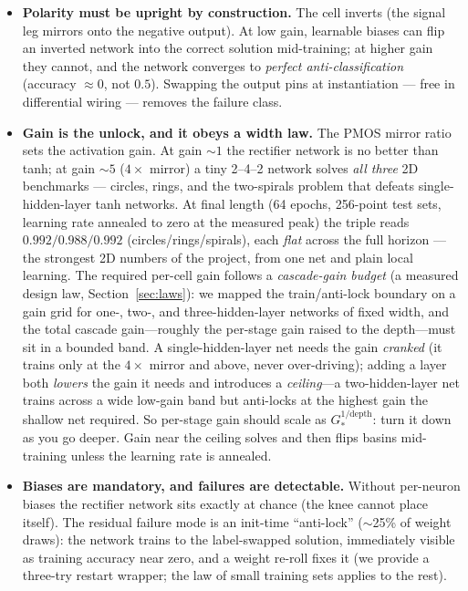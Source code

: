 \documentclass[11pt]{article}
\begin{document}
\begin{itemize}
\item \textbf{Polarity must be upright by construction.} The cell inverts (the signal leg mirrors onto the negative output). At low gain, learnable biases can flip an inverted network into the correct solution mid-training; at higher gain they cannot, and the network converges to \emph{perfect anti-classification} (accuracy $\approx 0$, not $0.5$). Swapping the output pins at instantiation --- free in differential wiring --- removes the failure class.
\item \textbf{Gain is the unlock, and it obeys a width law.} The PMOS mirror ratio sets the activation gain. At gain ${\sim}1$ the rectifier network is no better than tanh; at gain ${\sim}5$ ($4\times$ mirror) a tiny 2--4--2 network solves \emph{all three} 2D benchmarks --- circles, rings, and the two-spirals problem that defeats single-hidden-layer tanh networks. At final length (64 epochs, 256-point test sets, learning rate annealed to zero at the measured peak) the triple reads $\mathbf{0.992 / 0.988 / 0.992}$ (circles/rings/spirals), each \emph{flat} across the full horizon --- the strongest 2D numbers of the project, from one net and plain local learning. The required per-cell gain follows a \emph{cascade-gain budget} (a measured design law, Section~\ref{sec:laws}): we mapped the train/anti-lock boundary on a gain grid for one-, two-, and three-hidden-layer networks of fixed width, and the total cascade gain---roughly the per-stage gain raised to the depth---must sit in a bounded band. A single-hidden-layer net needs the gain \emph{cranked} (it trains only at the $4\times$ mirror and above, never over-driving); adding a layer both \emph{lowers} the gain it needs and introduces a \emph{ceiling}---a two-hidden-layer net trains across a wide low-gain band but anti-locks at the highest gain the shallow net required. So per-stage gain should scale as $G_*^{1/\text{depth}}$: turn it down as you go deeper. Gain near the ceiling solves and then flips basins mid-training unless the learning rate is annealed.
\item \textbf{Biases are mandatory, and failures are detectable.} Without per-neuron biases the rectifier network sits exactly at chance (the knee cannot place itself). The residual failure mode is an init-time ``anti-lock'' ($\sim$25\% of weight draws): the network trains to the label-swapped solution, immediately visible as training accuracy near zero, and a weight re-roll fixes it (we provide a three-try restart wrapper; the law of small training sets applies to the rest).
\end{itemize}
\end{document}
